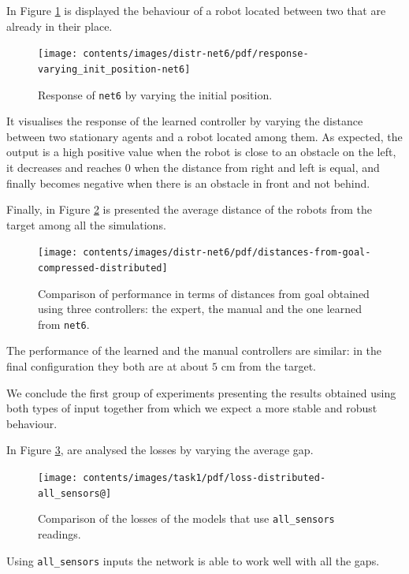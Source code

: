 In Figure \ref{fig:net6responseposition} is displayed the behaviour of a robot 
located between two that are already in their place.
\begin{figure}[!htb]
	\centering
	\texttt{[image: contents/images/distr-net6/pdf/response-varying\_init\_position-net6]}%
	\caption{Response of \texttt{net6} by varying the initial position.}
	\label{fig:net6responseposition}
\end{figure}
It visualises the response of the learned controller by varying the distance 
between two stationary agents and a robot located among them.
As expected, the output is a high positive value when the robot is close to an 
obstacle on the left, it decreases and reaches $0$ when the distance from 
right and left is equal, and finally becomes negative when there is an obstacle in 
front and not behind. 

Finally, in Figure \ref{fig:net6distance} is presented the average distance of the 
robots from the target among all the simulations. 
\begin{figure}[!htb]
	\centering
	\texttt{[image: contents/images/distr-net6/pdf/distances-from-goal-compressed-distributed]}%
		\caption[Evaluation of \texttt{net6} distances from goal.]{Comparison of 
		performance in terms of distances from goal obtained using three 
		controllers: the expert, the manual and the one learned from \texttt{net6}.}
	\label{fig:net6distance}
\end{figure}
The performance of the learned and the manual controllers are similar: in the 
final configuration they both are at about $5$ \gls{cm} from the target. 

We conclude the first group of experiments presenting the results obtained 
using both types of input together from which we expect a more stable and 
robust behaviour. 

In Figure \ref{fig:distlossall}, are analysed the losses by varying the average gap. 
\begin{figure}[!htb]
	\centering
	\texttt{[image: contents/images/task1/pdf/loss-distributed-all\_sensors@]}%
	\caption{Comparison of the losses of the models that use \texttt{all\_sensors} 
		readings.}
	\label{fig:distlossall}
\end{figure}
Using \texttt{all\_sensors} inputs the network is able to work well with all the 
gaps. 

